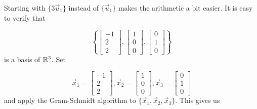\documentclass{ximera}
\begin{document}
\begin{example}
\begin{explanation}
Starting with $\{ 3\vec{u}_1 \}$ instead of $\{ \vec{u}_1 \}$ makes the
arithmetic a bit easier.
It is easy to verify that

\[ \left\{ \left[\begin{array}{r} -1 \\ 2 \\ 2 \end{array}\right],
\left[\begin{array}{r} 1 \\ 0 \\ 0 \end{array}\right],
\left[\begin{array}{r} 0 \\ 1 \\ 0 \end{array}\right]\right\}\]
is a basis of $\mathbb{R}^3$.  Set

\[ \vec{x}_1 = \left[\begin{array}{r} -1 \\ 2 \\ 2 \end{array}\right],
\vec{x}_2 = \left[\begin{array}{r} 1 \\ 0 \\ 0 \end{array}\right],
\vec{x}_3 =\left[\begin{array}{r} 0 \\ 1 \\ 0 \end{array}\right]\]
and apply the Gram-Schmidt algorithm to
$\{ \vec{x}_1, \vec{x}_2, \vec{x}_3\}$. This gives us


\end{explanation}
\end{example}
\end{document}

